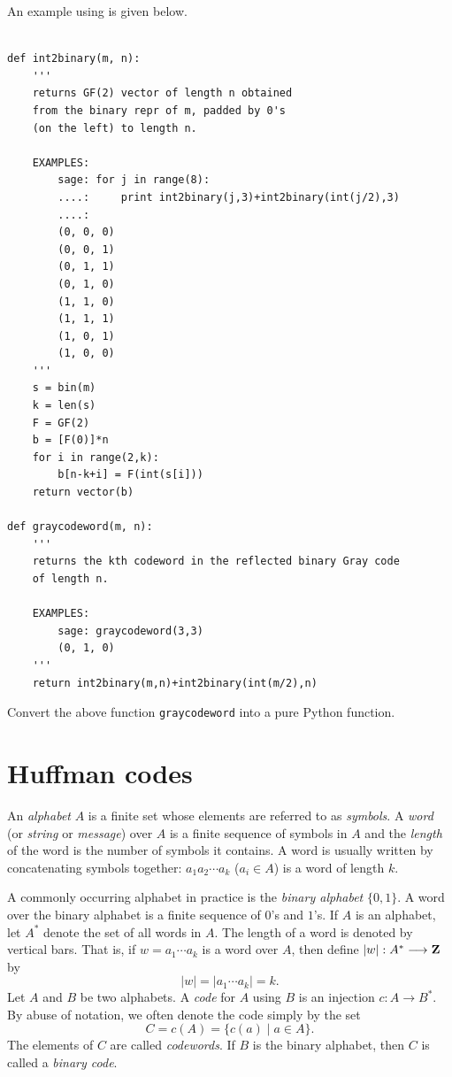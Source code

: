 An example using \sage is given below.

\begin{Verbatim}[fontsize=\scriptsize,fontfamily=courier,fontshape=tt,frame=single,label=\sage]

def int2binary(m, n):
    '''
    returns GF(2) vector of length n obtained
    from the binary repr of m, padded by 0's
    (on the left) to length n.

    EXAMPLES:
        sage: for j in range(8):
        ....:     print int2binary(j,3)+int2binary(int(j/2),3)
        ....:
        (0, 0, 0)
        (0, 0, 1)
        (0, 1, 1)
        (0, 1, 0)
        (1, 1, 0)
        (1, 1, 1)
        (1, 0, 1)
        (1, 0, 0)
    '''
    s = bin(m)
    k = len(s)
    F = GF(2)
    b = [F(0)]*n
    for i in range(2,k):
        b[n-k+i] = F(int(s[i]))
    return vector(b)

def graycodeword(m, n):
    '''
    returns the kth codeword in the reflected binary Gray code
    of length n.

    EXAMPLES:
        sage: graycodeword(3,3)
        (0, 1, 0)
    '''
    return int2binary(m,n)+int2binary(int(m/2),n)

\end{Verbatim}

\begin{exercise}
Convert the above function {\tt graycodeword} into a pure Python
function.
\end{exercise}



\section{Huffman codes}

An \emph{alphabet} $A$ is a finite set whose elements
are referred to as \emph{symbols}. A \emph{word} (or
\emph{string} or \emph{message}) over $A$
is a finite sequence of symbols in $A$ and the \emph{length} of the
word is the number of symbols it contains. A word is usually written
by concatenating symbols together: $a_1 a_2 \cdots a_k$ ($a_i \in A$)
is a word of length $k$.

A commonly occurring alphabet in practice is the \emph{binary alphabet}
$\{0,1\}$. A word over the binary alphabet is a finite sequence of
$0$'s and $1$'s. If $A$ is an alphabet, let $A^*$ denote the set of
all words in $A$. The length of a word is denoted by vertical
bars. That is, if $w = a_1 \cdots a_k$ is a word over $A$, then define
$|w|: A^* \longrightarrow \mathbf{Z}$ by
\[
|w|
=
|a_1 \cdots a_k|
=
k.
\]
Let $A$ and $B$ be two alphabets. A \emph{code} for $A$
using $B$ is an injection $c: A \longrightarrow B^*$. By abuse of
notation, we often denote the code simply by the set
\[
C
=
c(A)
=
\{c(a) \;|\; a \in A\}.
\]
The elements of $C$ are called \emph{codewords}. If
$B$ is the binary alphabet, then $C$ is called a
\emph{binary code}.


